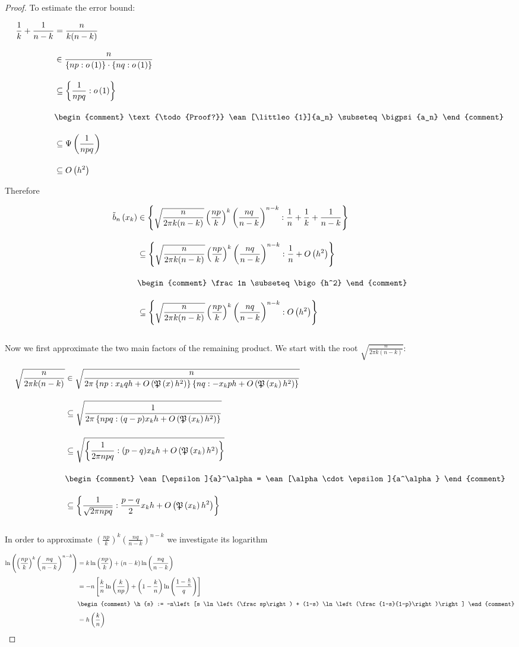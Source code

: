\begin{proof}
  \noindent To estimate the error bound:

  \begin{align}
    \frac 1k + \frac 1{n-k} & = \frac{n}{k(n-k)} \bnl
    & \in \frac{n}{\ean[\littleo{1}]{np}\cdot \ean[\littleo{1}]{nq}} \bnl
    & \subseteq \ean[\littleo{1}]{\frac{1}{npq}} \bnl
    &
    \begin{comment}
      \text{\todo{Proof?}} \ean[\littleo{1}]{a_n} \subseteq \bigpsi{a_n}
    \end{comment} \bnl
    & \subseteq \bigpsi{\frac{1}{npq}} \bnl
    & \subseteq \bigo{h^2}
  \end{align}

  \noindent Therefore

  \begin{align}
    \bb{\x} & \in \ean[\frac 1n + \frac 1k + \frac 1{n-k}]{\sqrt{\frac{n}{2\pi k (n-k)}} \left(\frac{np}{k}\right)^k \left(\frac{nq}{n-k}\right)^{n-k}} \bnl
    & \subseteq \ean[\frac 1n + \bigo{h^2}]{\sqrt{\frac{n}{2\pi k (n-k)}} \left(\frac{np}{k}\right)^k \left(\frac{nq}{n-k}\right)^{n-k}} \bnl
    &
    \begin{comment}
      \frac 1n \subseteq \bigo{h^2}
    \end{comment} \bnl
    & \subseteq \ean[\bigo{h^2}]{\sqrt{\frac{n}{2\pi k (n-k)}} \left(\frac{np}{k}\right)^k \left(\frac{nq}{n-k}\right)^{n-k}} \bnl
  \end{align}

  Now we first approximate the two main factors of the remaining product. We start with the root $\sqrt{\frac{n}{2\pi k(n-k)}}$:

  \begin{align}
    \sqrt{\frac{n}{2\pi k(n-k)}} & \in \sqrt{\frac{n}{2\pi \ean[\x qh +\bigo{\pol{x}h^2}]{np} \ean[-\x ph + \bigo{\pol{\x}h^2}]{nq}}} \bnl
    & \subseteq \sqrt{\frac{1}{2\pi \ean[(q-p)\x h +\bigo{\pol{\x}h^2}]{npq}}} \bnl
    & \subseteq \sqrt{\ean[(p-q) \x h + \bigo{\pol{\x}h^2}]{\frac{1}{2\pi npq}}} \bnl
    &
    \begin{comment}
      \ean[\epsilon]{a}^\alpha = \ean[\alpha \cdot \epsilon]{a^\alpha}
    \end{comment} \bnl
    & \subseteq \ean[\frac{p-q}2 \x h + \bigo{\pol{\x}h^2}]{\frac{1}{\sqrt{2\pi npq}}} \bnl
  \end{align}

  \noindent In order to approximate $\left(\frac{np}{k}\right)^k \left(\frac{nq}{n-k}\right)^{n-k}$ we investigate its logarithm

  \begin{align}
    \ln\left(\left(\frac{np}{k}\right)^k \left(\frac{nq}{n-k}\right)^{n-k}\right) & = k \ln\left(\frac{np}{k}\right) + (n-k) \ln\left(\frac{nq}{n-k}\right) \nl
    &=-n \left[ \frac kn \ln\left(\frac{k}{np}\right) + \left(1-\frac kn\right) \ln\left(\frac{1-\frac kn}{q}\right)\right] \nl
    &
    \begin{comment}
      \h{s} := -n\left[s \ln\left(\frac sp\right) + (1-s) \ln\left(\frac{1-s}{1-p}\right)\right]
    \end{comment} \nl
    &= \h{\frac kn}
  \end{align}


\end{proof}
